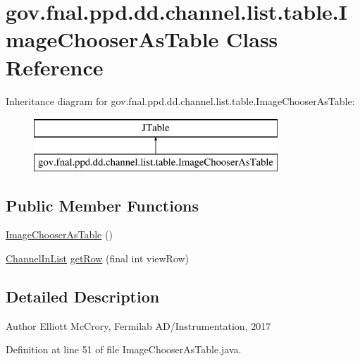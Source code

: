 \hypertarget{classgov_1_1fnal_1_1ppd_1_1dd_1_1channel_1_1list_1_1table_1_1ImageChooserAsTable}{\section{gov.\-fnal.\-ppd.\-dd.\-channel.\-list.\-table.\-Image\-Chooser\-As\-Table Class Reference}
\label{classgov_1_1fnal_1_1ppd_1_1dd_1_1channel_1_1list_1_1table_1_1ImageChooserAsTable}
}
Inheritance diagram for gov.\-fnal.\-ppd.\-dd.\-channel.\-list.\-table.\-Image\-Chooser\-As\-Table\-:\begin{figure}[H]
\begin{center}
\leavevmode
\includegraphics[height=2.000000cm]{classgov_1_1fnal_1_1ppd_1_1dd_1_1channel_1_1list_1_1table_1_1ImageChooserAsTable}
\end{center}
\end{figure}
\subsection*{Public Member Functions}
\begin{DoxyCompactItemize}
\item 
\hyperlink{classgov_1_1fnal_1_1ppd_1_1dd_1_1channel_1_1list_1_1table_1_1ImageChooserAsTable_a858581e0d46336c42a0134a9e7c0c254}{Image\-Chooser\-As\-Table} ()
\item 
\hyperlink{classgov_1_1fnal_1_1ppd_1_1dd_1_1channel_1_1ChannelInList}{Channel\-In\-List} \hyperlink{classgov_1_1fnal_1_1ppd_1_1dd_1_1channel_1_1list_1_1table_1_1ImageChooserAsTable_a9f26ba4f35ca09da14792b4b8b05c94e}{get\-Row} (final int view\-Row)
\end{DoxyCompactItemize}


\subsection{Detailed Description}
\begin{DoxyAuthor}{Author}
Elliott Mc\-Crory, Fermilab A\-D/\-Instrumentation, 2017 
\end{DoxyAuthor}


Definition at line 51 of file Image\-Chooser\-As\-Table.\-java.



